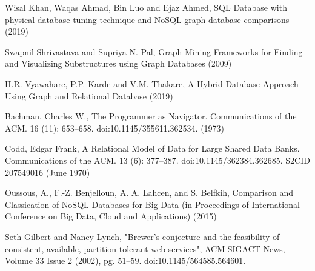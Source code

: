 \documentclass[10pt,        %
               a4paper,     %
               journal,     %
               ]{IEEEtran}
\begin{document}
%
%
\begin{thebibliography}{3}


Wisal Khan, Waqas Ahmad, Bin Luo and Ejaz Ahmed, SQL Database with physical database tuning technique and NoSQL graph database comparisons
(2019)

Swapnil Shrivastava and Supriya N. Pal, Graph Mining Frameworks for Finding and Visualizing Substructures using Graph Databases
(2009)

H.R. Vyawahare, P.P. Karde and V.M. Thakare, A Hybrid Database Approach Using Graph and Relational Database
(2019)

Bachman, Charles W., The Programmer as Navigator. Communications of the ACM. 16 (11): 653–658. doi:10.1145/355611.362534.
(1973)

Codd, Edgar Frank, A Relational Model of Data for Large Shared Data Banks. Communications of the ACM. 13 (6): 377–387. doi:10.1145/362384.362685. S2CID 207549016
(June 1970)

Oussous, A., F.-Z. Benjelloun, A. A. Lahcen, and S. Belfkih, Comparison and Classication of NoSQL Databases for Big Data (in Proceedings of International Conference on Big Data, Cloud and Applications)
(2015)

Seth Gilbert and Nancy Lynch, "Brewer's conjecture and the feasibility of consistent, available, partition-tolerant web services", ACM SIGACT News, Volume 33 Issue 2 (2002), pg. 51–59. doi:10.1145/564585.564601.

\end{thebibliography}

% 
\end{document}
